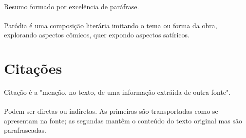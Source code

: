 \paragraph{}
Resumo formado por excelência de paráfrase.

\paragraph{}
Paródia é uma composição literária imitando o tema ou forma da obra, explorando aspectos cômicos, quer expondo aspectos satíricos.

\section{Citações}

\paragraph{}
Citação é a "menção, no texto, de uma informação extráida de outra fonte".

\paragraph{}
Podem ser diretas ou indiretas. As primeiras são transportadas como se apresentam na fonte; as segundas mantêm o conteúdo do texto original mas são parafraseadas.
